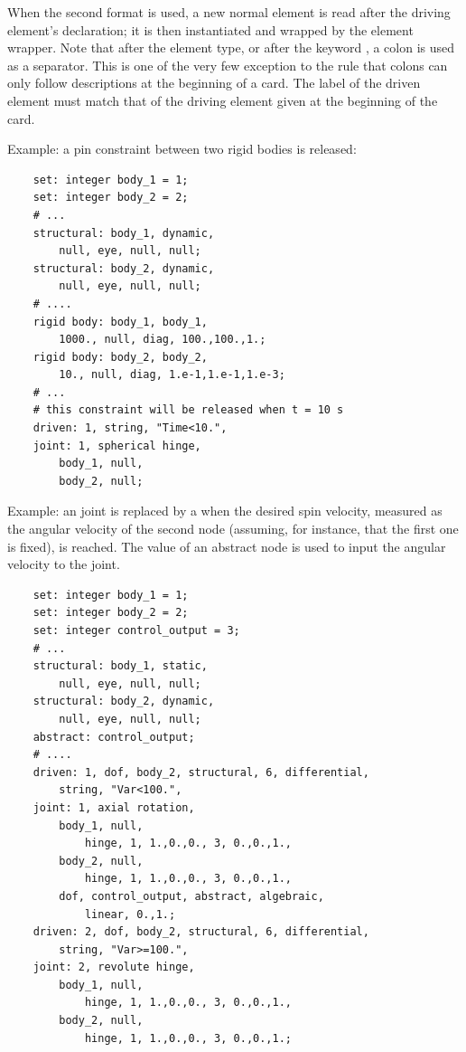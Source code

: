 When the second format is used, a new normal element is read 
after the driving element's declaration; it is then instantiated 
and wrapped by the  element wrapper.
Note that after the element type,
or after the keyword , a colon is used as a separator.
This is one of the very few  exception to the rule that colons 
can only follow descriptions at the beginning of a card.
The label of the driven element must match that of the driving element 
given at the beginning of the card.

\noindent
Example: a pin constraint between two rigid bodies is released:
\begin{verbatim}
    set: integer body_1 = 1;
    set: integer body_2 = 2;
    # ...
    structural: body_1, dynamic,
        null, eye, null, null;
    structural: body_2, dynamic,
        null, eye, null, null;
    # ....
    rigid body: body_1, body_1,
        1000., null, diag, 100.,100.,1.;
    rigid body: body_2, body_2,
        10., null, diag, 1.e-1,1.e-1,1.e-3;
    # ...
    # this constraint will be released when t = 10 s
    driven: 1, string, "Time<10.",
    joint: 1, spherical hinge,
        body_1, null,
        body_2, null;
\end{verbatim}

\noindent
Example: an  joint is replaced by a 
when the desired spin velocity, measured as the angular velocity
of the second node (assuming, for instance, that the first one is fixed),
is reached.
The value of an abstract node is used to input the angular velocity 
to the  joint.
\begin{verbatim}
    set: integer body_1 = 1;
    set: integer body_2 = 2;
    set: integer control_output = 3;
    # ...
    structural: body_1, static,
        null, eye, null, null;
    structural: body_2, dynamic,
        null, eye, null, null;
    abstract: control_output;
    # ....
    driven: 1, dof, body_2, structural, 6, differential,
        string, "Var<100.",
    joint: 1, axial rotation,
        body_1, null,
            hinge, 1, 1.,0.,0., 3, 0.,0.,1.,
        body_2, null,
            hinge, 1, 1.,0.,0., 3, 0.,0.,1.,
        dof, control_output, abstract, algebraic,
            linear, 0.,1.;
    driven: 2, dof, body_2, structural, 6, differential,
        string, "Var>=100.",
    joint: 2, revolute hinge,
        body_1, null,
            hinge, 1, 1.,0.,0., 3, 0.,0.,1.,
        body_2, null,
            hinge, 1, 1.,0.,0., 3, 0.,0.,1.;
\end{verbatim}




